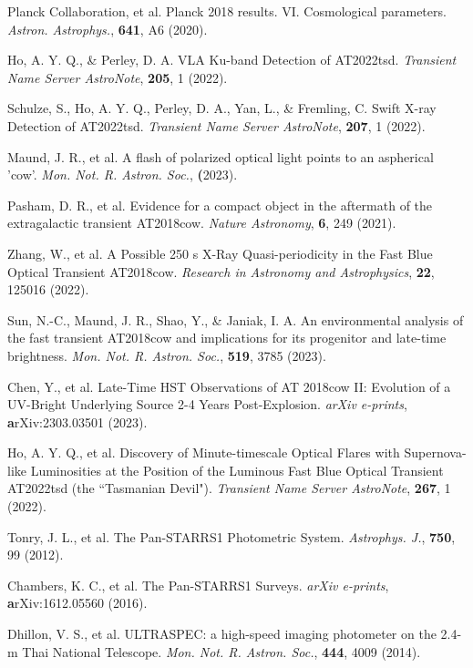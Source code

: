 \documentclass{nature_plusfigure}
\newcommand{\mn}{{Mon. Not. R. Astron. Soc.}}
\newcommand{\mnras}{\mn}
\newcommand{\apj}{{Astrophys. J.}}
\newcommand{\aap}{{Astron. Astrophys.}}
\begin{document}
\begin{thebibliography}{100}
 Planck Collaboration, et al. Planck 2018 results. VI. Cosmological parameters. \emph{\aap}, \textbf{641}, A6 (2020). 

 Ho, A. Y. Q., \& Perley, D. A. VLA Ku-band Detection of AT2022tsd. \emph{Transient Name Server AstroNote}, \textbf{205}, 1 (2022). 

 Schulze, S., Ho, A. Y. Q., Perley, D. A., Yan, L., \& Fremling, C. Swift X-ray Detection of AT2022tsd. \emph{Transient Name Server AstroNote}, \textbf{207}, 1 (2022). 


 Maund, J. R., et al. A flash of polarized optical light points to an aspherical 'cow'. \emph{\mnras}, \textbf (2023). 

 Pasham, D. R., et al. Evidence for a compact object in the aftermath of the extragalactic transient AT2018cow. \emph{Nature Astronomy}, \textbf{6}, 249 (2021). 

 Zhang, W., et al. A Possible 250 s X-Ray Quasi-periodicity in the Fast Blue Optical Transient AT2018cow. \emph{Research in Astronomy and Astrophysics}, \textbf{22}, 125016 (2022). 

 Sun, N.-C., Maund, J. R., Shao, Y., \& Janiak, I. A. An environmental analysis of the fast transient AT2018cow and implications for its progenitor and late-time brightness. \emph{\mnras}, \textbf{519}, 3785 (2023). 

 Chen, Y., et al. Late-Time HST Observations of AT 2018cow II: Evolution of a UV-Bright Underlying Source 2-4 Years Post-Explosion. \emph{arXiv e-prints}, \textbf arXiv:2303.03501 (2023). 


 Ho, A. Y. Q., et al. Discovery of Minute-timescale Optical Flares with Supernova-like Luminosities at the Position of the Luminous Fast Blue Optical Transient AT2022tsd (the ``Tasmanian Devil"). \emph{Transient Name Server AstroNote}, \textbf{267}, 1 (2022). 

 Tonry, J. L., et al. The Pan-STARRS1 Photometric System. \emph{\apj}, \textbf{750}, 99 (2012). 

 Chambers, K. C., et al. The Pan-STARRS1 Surveys. \emph{arXiv e-prints}, \textbf arXiv:1612.05560 (2016). 

 Dhillon, V. S., et al. ULTRASPEC: a high-speed imaging photometer on the 2.4-m Thai National Telescope. \emph{\mnras}, \textbf{444}, 4009 (2014). 


\end{thebibliography}
\end{document}
